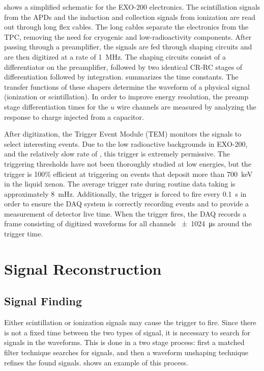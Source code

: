 \documentclass[herrin-thesis.tex]{subfiles}
\begin{document}
 shows a simplified schematic for the EXO-200 electronics. The scintillation signals from the APDs and the induction and collection signals from ionization are read out through long flex cables. The long cables separate the electronics from the TPC, removing the need for cryogenic and low-radioactivity components. After passing through a preamplifier, the signals are fed through shaping circuits and are then digitized at a rate of \SI{1}{\MHz}. The shaping circuits consist of a differentiator on the preamplifier, followed by two identical CR-RC stages of differentiation followed by integration.  summarizes the time constants.  The transfer functions of these shapers determine the waveform of a physical signal (ionization or scintillation). In order to improve energy resolution, the preamp stage differentiation times for the \(u\) wire channels are measured by analyzing the response to charge injected from a capacitor.

After digitization, the Trigger Event Module (TEM) monitors the signals to select interesting events. Due to the low radioactive backgrounds in EXO-200, and the relatively slow rate of \twonu, this trigger is extremely permissive. The triggering thresholds have not been thoroughly studied at low energies, but the trigger is 100\% efficient at triggering on events that deposit more than \SI{700}{\keV} in the liquid xenon. The average trigger rate during routine data taking is approximately \SI{8}{\mHz}. Additionally, the trigger is forced to fire every \SI{0.1}{\s} in order to ensure the DAQ system is correctly recording events and to provide a measurement of detector live time. When the trigger fires, the DAQ records a frame consisting of digitized waveforms for all channels \SI{\pm1024}{\micro\s} around the trigger time.

\section{Signal Reconstruction}
\label{sec:data_reconstruction}
\subsection{Signal Finding}
\label{sec:data_signal_finding}
Either scintillation or ionization signals may cause the trigger to fire. Since there is not a fixed time between the two types of signal, it is necessary to search for signals in the waveforms. This is done in a two stage process: first a matched filter technique searches for signals, and then a waveform unshaping technique refines the found signals.  shows an example of this process.
\end{document}
